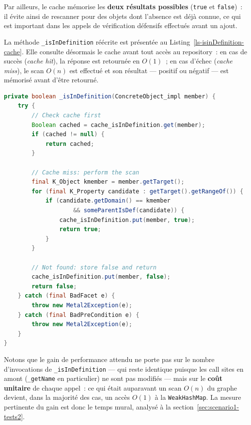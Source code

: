 Par ailleurs, le cache mémorise les \textbf{deux résultats possibles}
(\texttt{true} et \texttt{false})~: il évite ainsi de rescanner pour
des objets dont l'absence est déjà connue, ce qui est important dans les
appels de vérification défensifs effectués avant un ajout.

La méthode \texttt{\_isInDefinition} réécrite est présentée au
Listing~\ref{ls-isinDefinition-cache}. Elle consulte désormais le
cache avant tout accès au repository~: en cas de succès
(\textit{cache hit}), la réponse est retournée en $O(1)$~; en cas
d'échec (\textit{cache miss}), le scan $O(n)$ est effectué et son
résultat --- positif ou négatif --- est mémorisé avant d'être
retourné.

\begin{lstlisting}[language=Java, firstnumber=141,
  caption={\texttt{\_isInDefinition} après l'optimisation~4 ---
  classe \texttt{ConcreteModel\_impl},
  bundle \texttt{metadone\_bundle\_metabusiness}. Le cache est
  consulté avant tout scan~; les deux résultats (positif et
  négatif) sont mémorisés.},
  label={ls-isinDefinition-cache}]
private boolean _isInDefinition(ConcreteObject_impl member) {
    try {
        // Check cache first
        Boolean cached = cache_isInDefinition.get(member);
        if (cached != null) {
            return cached;
        }

        // Cache miss: perform the scan
        final K_Object kmember = member.getTarget();
        for (final K_Property candidate : getTarget().getRangeOf()) {
            if (candidate.getDomain() == kmember
                    && someParentIsDef(candidate)) {
                cache_isInDefinition.put(member, true);
                return true;
            }
        }

        // Not found: store false and return
        cache_isInDefinition.put(member, false);
        return false;
    } catch (final BadFacet e) {
        throw new Metal2Exception(e);
    } catch (final BadPreCondition e) {
        throw new Metal2Exception(e);
    }
}
\end{lstlisting}

Notons que le gain de performance attendu ne porte pas sur le nombre
d'invocations de \texttt{\_isInDefinition} --- qui reste identique
puisque les call sites en amont (\texttt{\_getName} en particulier)
ne sont pas modifiés --- mais sur le \textbf{coût unitaire} de chaque
appel~: ce qui était auparavant un scan $O(n)$ du graphe devient,
dans la majorité des cas, un accès $O(1)$ à la \texttt{WeakHashMap}.
La mesure pertinente du gain est donc le temps mural, analysé à la
section~\ref{sec:scenario1-tests2}.

